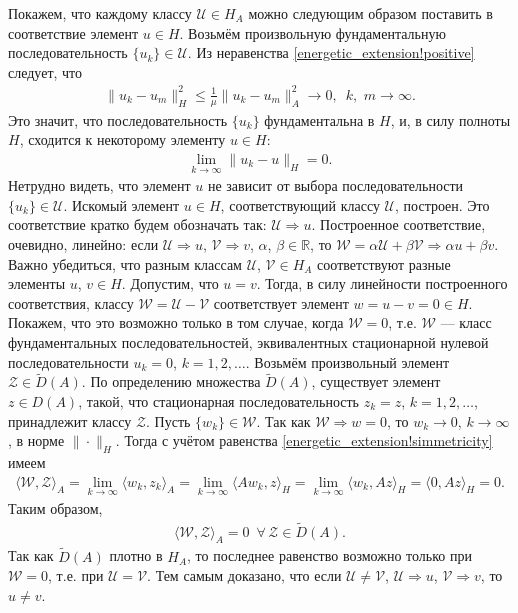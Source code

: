\documentclass{report}
\begin{document}
Покажем, что каждому классу $\mathcal{U}\in H_A$ можно следующим образом поставить в соответствие элемент $u\in H$. Возьмём произвольную фундаментальную последовательность $\{u_k\}\in
\mathcal{U}$. Из неравенства \eqref{energetic_extension!positive} следует, что
\begin{gather*}
\|u_k-u_m\|_{H}^2\leqslant\frac1\mu\|u_k-u_m\|^2_A\to0,\,\,\,k,\,\,m\to\infty.
\end{gather*}
Это значит, что последовательность $\{u_k\}$ фундаментальна в $H$, и, в силу полноты $H$, сходится к некоторому элементу $u\in H$:
\begin{gather*}
\lim\limits_{k\to\infty}\|u_k-u\|_H=0.
\end{gather*}
Нетрудно видеть, что элемент $u$ не зависит от выбора последовательности $\{u_k\}\in\mathcal{U}$. Искомый элемент $u\in H$, соответствующий классу $\mathcal{U}$, построен. Это соответствие
кратко будем обозначать так: $\mathcal{U}\Rightarrow u$. Построенное соответствие, очевидно, линейно: если $\mathcal{U}\Rightarrow u$, $\mathcal{V}\Rightarrow v$, $\alpha$, $\beta\in
\mathbb{R}$, то $\mathcal{W}=\alpha\mathcal{U}+\beta\mathcal{V}\Rightarrow\alpha u+\beta v$. Важно убедиться, что разным классам $\mathcal{U}$, $\mathcal{V}\in H_A$ соответствуют разные
элементы $u$, $v\in H$. Допустим, что $u=v$. Тогда, в силу линейности построенного соответствия, классу $\mathcal{W}=\mathcal{U}-\mathcal{V}$ соответствует элемент $w=u-v=0\in H$. Покажем,
что это возможно только в том случае, когда $\mathcal{W}=0$, т.е.  $\mathcal{W}$ --- класс фундаментальных последовательностей, эквивалентных стационарной нулевой последовательности
$u_k=0$, $k=1,2,\dots$. Возьмём произвольный элемент $\mathcal{Z}\in\tilde{D}(A)$. По определению множества $\tilde{D}(A)$, существует элемент $z\in D(A)$, такой, что стационарная
последовательность $z_k=z$, $k=1,2,\dots$, принадлежит классу $\mathcal{Z}$. Пусть $\{w_k\}\in\mathcal{W}$. Так как $\mathcal{W}\Rightarrow w=0$, то $w_k\to0$, $k\to\infty$, в норме
$\|\cdot\|_H$. Тогда с учётом равенства \eqref{energetic_extension!simmetricity} имеем
\begin{gather*}
\langle\mathcal{W},\mathcal{Z}\rangle_A=\lim\limits_{k\to\infty}\langle w_k,z_k\rangle_A=\lim\limits_{k\to\infty}\langle Aw_k,z\rangle_H=
\lim\limits_{k\to\infty}\langle w_k,Az\rangle_H=\langle 0,Az\rangle_H=0.
\end{gather*}
Таким образом,
\begin{gather*}
\langle\mathcal{W},\mathcal{Z}\rangle_A=0\,\,\,\forall\,\mathcal{Z}\in\tilde{D}(A).
\end{gather*}
Так как $\tilde{D}(A)$ плотно в $H_A$, то последнее равенство возможно только при $\mathcal{W}=0$, т.е. при $\mathcal{U}=\mathcal{V}$. Тем самым доказано, что если $\mathcal{U}\neq
\mathcal{V}$, $\mathcal{U}\Rightarrow u$, $\mathcal{V}\Rightarrow v$, то $u\neq v$.
\end{document}
